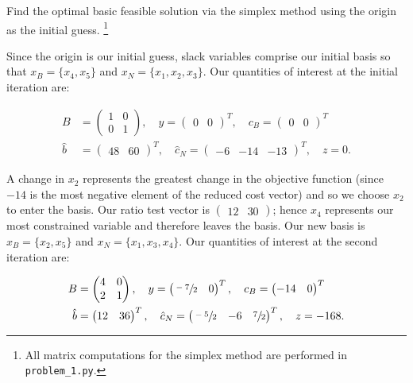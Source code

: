 Find the optimal basic feasible solution via the simplex method using the origin as the initial guess. \footnote{
  All matrix computations for the simplex method are performed in \texttt{problem\_1.py}.
}

\begin{solution}
  Since the origin is our initial guess, slack variables comprise our initial basis so that 
  $x_B = \{ x_4, x_5 \}$ and $x_N = \{ x_1, x_2, x_3 \}$. Our quantities of interest at the initial iteration are:


  \begin{align*}
    B &= \begin{pmatrix}
      1 & 0 \\
      0 & 1
    \end{pmatrix}, \quad y = \begin{pmatrix}
      0 & 0
    \end{pmatrix}^T, \quad c_B = \begin{pmatrix}
      0 & 0
    \end{pmatrix}^T \\
    \hat{b} &= \begin{pmatrix}
      48 & 60
    \end{pmatrix}^T, \quad \hat{c}_N = \begin{pmatrix}
      -6 & -14 & -13
    \end{pmatrix}^T, \quad z = 0.
  \end{align*}

  A change in $x_2$ represents the greatest change in the objective function (since $-14$ is the most negative element of
  the reduced cost vector) and so we choose $x_2$ to enter the basis. Our ratio test vector is 
  $\begin{pmatrix} 12 & 30 \end{pmatrix}$; hence $x_4$ represents our most constrained variable and therefore leaves 
  the basis. Our new basis is $x_B = \{ x_2, x_5 \}$ and $x_N = \{ x_1, x_3, x_4 \}$. Our quantities of interest at the
  second iteration are:

  \begin{align*}
    B &= \begin{pmatrix}
      4 & 0 \\
      2 & 1
    \end{pmatrix}, \quad y = \begin{pmatrix}
      \sfrac{-7}{2} & 0
    \end{pmatrix}^T, \quad c_B = \begin{pmatrix}
      -14 & 0
    \end{pmatrix}^T \\
    \hat{b} &= \begin{pmatrix}
      12 & 36
    \end{pmatrix}^T, \quad \hat{c}_N = \begin{pmatrix}
      \sfrac{-5}{2} & -6 & \sfrac{7}{2}
    \end{pmatrix}^T, \quad z = -168.
  \end{align*}


\end{solution}
